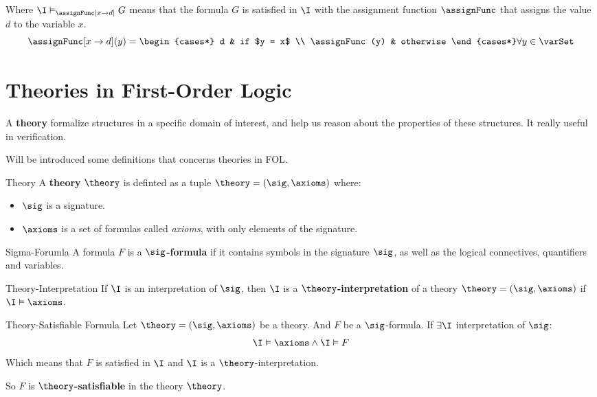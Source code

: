 Where $\I \vDash_{\assignFunc[x\rightarrow d]} G$ means that the formula $G$ is satisfied in $\I$
with the assignment function $\assignFunc$ that assigns the value $d$ to the variable $x$.
\begin{equation*}
    \assignFunc[x\rightarrow d](y) = 
    \begin{cases*}
        d & if $y = x$ \\
        \assignFunc(y) & otherwise
    \end{cases*}
    \forall y \in \varSet
\end{equation*}

\section{Theories in First-Order Logic}
\label{sec:Theories in First-Order Logic}

A \textbf{theory} formalize structures in a specific domain of interest, 
and help us reason about the properties of these structures.
It really useful in verification.

Will be introduced some definitions that concerns theories in FOL.

\begin{definition}{Theory}
    A \textbf{theory} $\theory$ is definted as a tuple $\theory = (\sig,\axioms)$ where:
    \begin{itemize}
        \item $\sig$ is a signature.
        \item $\axioms$ is a set of formulas called \textit{axioms},
        with only elements of the signature.
    \end{itemize}
\end{definition}

\begin{definition}{Sigma-Forumla}
    A formula $F$ is a \textbf{$\sig$-formula} if it contains symbols in
    the signature $\sig$,
    as well as the logical connectives, quantifiers and variables.
\end{definition}

\begin{definition}{Theory-Interpretation}
    If $\I$ is an interpretation of $\sig$, then $\I$ is a \textbf{$\theory$-interpretation}
    of a theory $\theory = (\sig,\axioms)$ if $\I \vDash \axioms$.
\end{definition}

\begin{definition}{Theory-Satisfiable Formula}
    Let $\theory = (\sig,\axioms)$ be a theory. And $F$ be a $\sig$-formula.
    If $\exists \I$ interpretation of $\sig$:
    \begin{equation*}
        \I \vDash \axioms \land \I \vDash F
    \end{equation*}
    Which means that $F$ is satisfied in $\I$ and $\I$ is a $\theory$-interpretation.

    So $F$ is \textbf{$\theory$-satisfiable} in the theory $\theory$.
\end{definition}

